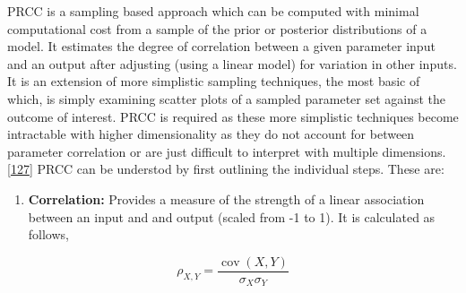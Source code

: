 \documentclass[11pt,twoside]{bristolthesis}
\providecommand{\tightlist}{%
  \setlength{\itemsep}{0pt}\setlength{\parskip}{0pt}}
\begin{document}
  PRCC is a sampling based approach which can be computed with minimal computational cost from a sample of the prior or posterior distributions of a model. It estimates the degree of correlation between a given parameter input and an output after adjusting (using a linear model) for variation in other inputs. It is an extension of more simplistic sampling techniques, the most basic of which, is simply examining scatter plots of a sampled parameter set against the outcome of interest. PRCC is required as these more simplistic techniques become intractable with higher dimensionality as they do not account for between parameter correlation or are just difficult to interpret with multiple dimensions.{[}\protect\hyperlink{ref-Marino2009a}{127}{]} PRCC can be understod by first outlining the individual steps. These are:
  \begin{enumerate}
  \def\labelenumi{\arabic{enumi}.}
  \tightlist
  \item
    \textbf{Correlation:} Provides a measure of the strength of a linear association between an input and and output (scaled from -1 to 1). It is calculated as follows,
  \end{enumerate}
  \[ 
  {\displaystyle \rho _{X,Y}={\frac {\operatorname {cov} (X,Y)}{\sigma _{X}\sigma _{Y}}}}
  \]
  
\end{document}
